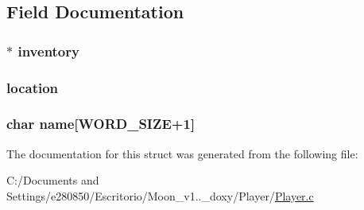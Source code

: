 \subsection{Field Documentation}
\hypertarget{struct___player_ae077c9247ee2900bd0a7f5528b73f150}{
\subsubsection[{inventory}]{$\ast$ inventory}}\label{struct___player_ae077c9247ee2900bd0a7f5528b73f150}
\hypertarget{struct___player_a5ef730c626751b65a24f4666d2c70a91}{
\subsubsection[{location}]{ location}}\label{struct___player_a5ef730c626751b65a24f4666d2c70a91}
\hypertarget{struct___player_a2b7341aac5f9360a8e88ae1061f497d2}{
\subsubsection[{name}]{\setlength{\rightskip}{0pt plus 5cm}char name\mbox{[}{\bf W\+O\+R\+D\+\_\+\+S\+I\+Z\+E}+1\mbox{]}}}\label{struct___player_a2b7341aac5f9360a8e88ae1061f497d2}


The documentation for this struct was generated from the following file\+:\begin{DoxyCompactItemize}
\item 
C\+:/\+Documents and Settings/e280850/\+Escritorio/\+Moon\+\_\+v1..\+\_\+doxy/\+Player/\hyperlink{_player_8c}{Player.\+c}\end{DoxyCompactItemize}
